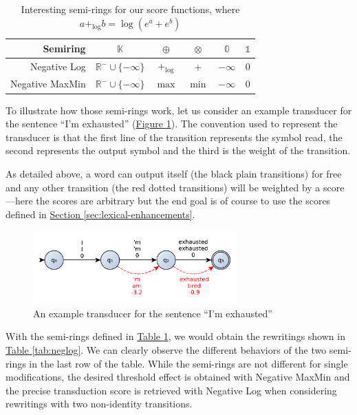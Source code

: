 \documentclass[a4paper, 11pt, onepage]{scrreprt}
\newcommand\tableref[1]{\hyperref[#1]{Table \ref*{#1}}}
\newcommand\figureref[1]{\hyperref[#1]{Figure \ref*{#1}}}
\newcommand\sectionref[1]{\hyperref[#1]{Section \ref*{#1}}}
\begin{document}
\begin{table}[H]
  \centering
  \caption{Interesting semi-rings for our score functions, where
    $a +_{\log} b = \log\left(e^a + e^b\right)$}
  \begin{tabular}{rccccc}
    \toprule
    Semiring & $\mathbb{K}$ & $\oplus$ & $\otimes$ & $\mathbb{0}$ & $\mathbb{1}$
    \\
    \midrule
    Negative Log & $\mathbb{R}^{-} \cup \{-\infty\}$ & $+_{\log}$ & $+$ & $-\infty$ & $0$ \\
    Negative MaxMin & $\mathbb{R}^{-} \cup \{-\infty\}$ & $\max$ & $\min$ & $-\infty$ & $0$ \\
  \end{tabular}
  \label{tab:semi-rings}
\end{table}

To illustrate how those semi-rings work, let us consider an example
transducer for the sentence “I'm exhausted”
(\figureref{fig:transducer-ex}). The convention used to represent the
transducer is that the first line of the transition represents the
symbol read, the second represents the output symbol and the third is
the weight of the transition.

As detailed above, a word can output itself (the black plain
transitions) for free and any other transition (the red dotted
transitions) will be weighted by a score—here the scores are arbitrary
but the end goal is of course to use the scores defined
in \sectionref{sec:lexical-enhancements}.

\begin{figure}[H]
  \centering
  \includegraphics[width=0.7\textwidth]{semirings}
  \caption{An example transducer for the sentence “I'm exhausted”}
  \label{fig:transducer-ex}
\end{figure}

With the semi-rings defined in \tableref{tab:semi-rings}, we would
obtain the rewritings shown in \tableref{tab:neglog}. We can clearly
observe the different behaviors of the two semi-rings in the last row
of the table. While the semi-rings are not different for single
modifications, the desired threshold effect is obtained with Negative
MaxMin and the precise transduction score is retrieved with Negative
Log when considering rewritings with two non-identity transitions.
\end{document}
